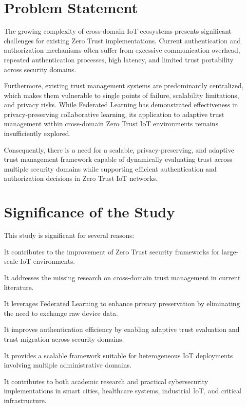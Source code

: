 \section{Problem Statement}

The growing complexity of cross-domain IoT ecosystems presents significant challenges for existing Zero Trust implementations. Current authentication and authorization mechanisms often suffer from excessive communication overhead, repeated authentication processes, high latency, and limited trust portability across security domains.


Furthermore, existing trust management systems are predominantly centralized, which makes them vulnerable to single points of failure, scalability limitations, and privacy risks. While Federated Learning has demonstrated effectiveness in privacy-preserving collaborative learning, its application to adaptive trust management within cross-domain Zero Trust IoT environments remains insufficiently explored.


Consequently, there is a need for a scalable, privacy-preserving, and adaptive trust management framework capable of dynamically evaluating trust across multiple security domains while supporting efficient authentication and authorization decisions in Zero Trust IoT networks.


\section{Significance of the Study}

This study is significant for several reasons:


It contributes to the improvement of Zero Trust security frameworks for large-scale IoT environments.


It addresses the missing research on cross-domain trust management in current literature.


It leverages Federated Learning to enhance privacy preservation by eliminating the need to exchange raw device data.


It improves authentication efficiency by enabling adaptive trust evaluation and trust migration across security domains.


It provides a scalable framework suitable for heterogeneous IoT deployments involving multiple administrative domains.


It contributes to both academic research and practical cybersecurity implementations in smart cities, healthcare systems, industrial IoT, and critical infrastructure.


